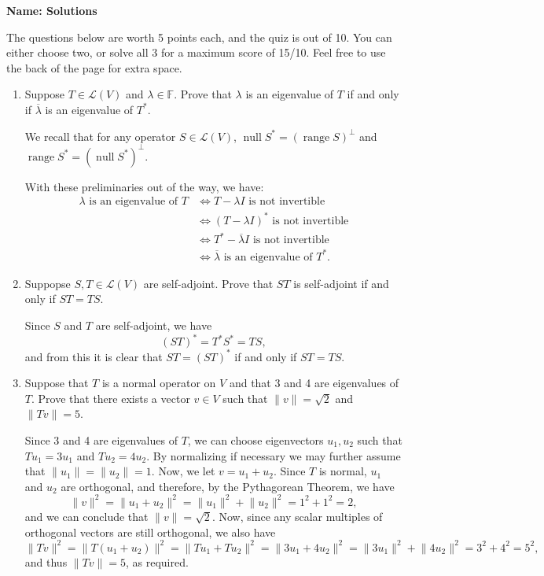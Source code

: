 \documentclass[12pt]{article}
\DeclareMathOperator{\range}{range}
\DeclareMathOperator{\nul}{null}
\newcommand{\len}[1]{\lVert #1\rVert}
\begin{document}
\thispagestyle{fancy}
{\bf Name: Solutions}

\bigskip

The questions below are worth 5 points each, and the quiz is out of 10. You can either choose two, or solve all 3 for a maximum score of 15/10. Feel free to use the back of the page for extra space.

\begin{enumerate}
 \item Suppose $T\in\mathcal{L}(V)$ and $\lambda\in\mathbb{F}$. Prove that $\lambda$ is an eigenvalue of $T$ if and only if $\overline{\lambda}$ is an eigenvalue of $T^*$.

\bigskip

We recall that for any operator $S\in\mathcal{L}(V)$, $\nul S^* = (\range S)^\bot$ and $\range S^* = (\nul S^*)^\bot$. 

With these preliminaries out of the way, we have:
\begin{align*}
 \lambda \text{ is an eigenvalue of } T &\Leftrightarrow T-\lambda I \text{ is not invertible}\\
&\Leftrightarrow (T-\lambda I)^* \text{ is not invertible}\\
&\Leftrightarrow T^*-\overline{\lambda}I \text{ is not invertible}\\
&\Leftrightarrow \overline{\lambda} \text{ is an eigenvalue of } T^*.
\end{align*}

\bigskip

 \item Suppopse $S,T\in\mathcal{L}(V)$ are self-adjoint. Prove that $ST$ is self-adjoint if and only if $ST=TS$.

\bigskip

Since $S$ and $T$ are self-adjoint, we have
\[
 (ST)^* = T^*S^* = TS,
\]
and from this it is clear that $ST=(ST)^*$ if and only if $ST=TS$.

\bigskip

 \item Suppose that $T$ is a normal operator on $V$ and that 3 and 4 are eigenvalues of $T$. Prove that there exists a vector $v\in V$ such that $\len{v}=\sqrt{2}$ and $\len{Tv} = 5$.

\bigskip

Since 3 and 4 are eigenvalues of $T$, we can choose eigenvectors $u_1,u_2$ such that $Tu_1=3u_1$ and $Tu_2=4u_2$. By normalizing if necessary we may further assume that $\len{u_1}=\len{u_2}=1$. Now, we let $v=u_1+u_2$. Since $T$ is normal, $u_1$ and $u_2$ are orthogonal, and therefore, by the Pythagorean Theorem, we have
\[
 \len{v}^2=\len{u_1+u_2}^2 = \len{u_1}^2+\len{u_2}^2 = 1^2+1^2=2,
\]
and we can conclude that $\len{v}=\sqrt{2}$. Now, since any scalar multiples of orthogonal vectors are still orthogonal, we also have
\[
 \len{Tv}^2 = \len{T(u_1+u_2)}^2 = \len{Tu_1+Tu_2}^2 = \len{3u_1+4u_2}^2 = \len{3u_1}^2+\len{4u_2}^2 = 3^2+4^2=5^2,
\]
and thus $\len{Tv} = 5$, as required.
\end{enumerate}
\end{document}
